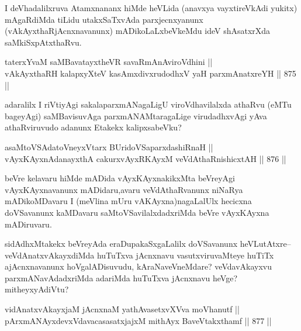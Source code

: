 \begin{artha}
I deVhadalilxruva Atamxnananx hiMde heVLida (anavxya vayxtireVkAdi yukitx) mAgaRdiMda tiLidu utakxSaTxvAda parxjecnxyanunx (vAkAyxthaRjAcnxnavanunx) mADikoLaLxbeVkeMdu ideV shAsatxrXda saMkiSxpAtxthaRvu.
\end{artha}

\begin{shl}
taterxYvaM saMBavatayxtheVR savaRmAnAviroVdhini ||  \\
vAkAyxthaRH kalapxyXteV kasAmxdivxrudodhxV yaH parxmAnatxreYH \hfill || 875 ||  
\end{shl}

\begin{artha}
adaralilx I riVtiyAgi sakalaparxmANagaLigU viroVdhavilalxda athaRvu (eMTu bageyAgi) saMBavisuvAga parxmANAMtaragaLige virudadhxvAgi yAva athaRviruvudo adanunx Etakekx kalipxsabeVku?
\end{artha}


\begin{shl}
asaMtoVSAdatoV\s neyxV\s tarx BUridoVSaparxdashiRnaH || \\
vAyxKAyxnAdanayxthA cakurxvAyxRKAyxM veVdAthaRnishicxtAH \hfill || 876 ||  
\end{shl}

\begin{artha}
beVre kelavaru hiMde mADida vAyxKAyxnakikxMta beVreyAgi vAyxKAyxnavanunx mADidaru,avaru veVdAthaRvanunx niNaRya mADikoMDavaru I (meVlina mUru vAKAyxna)nagaLalUlx hecicxna doVSavanunx kaMDavaru saMtoVSavilalxdadxriMda beVre vAyxKAyxna mADiruvaru.
\end{artha}

\begin{artha}
sidAdhxMtakekx beVreyAda eraDupakaSxgaLalilx doVSavanunx heVLutAtxre-- veVdAnatxvAkayxdiMda huTuTxva jAcnxnavu vasutxviruvaMteye huTiTx ajAcnxnavanunx hoVgalADisuvudu, kAraNaveVneMdare? veVdavAkayxvu parxmANavAdadxriMda adariMda huTuTxva jAcnxnavu heVge? mitheyxyAdiVtu?
\end{artha}

\begin{shl}
vidAnatxvAkayxjaM jAcnxnaM yathAvasetxvXVva moVhanutf || \\
pArxmANAyxdevxVdavacasasatxjajxM mithAyx BaveVtakxthamf \hfill || 877 ||  
\end{shl}



